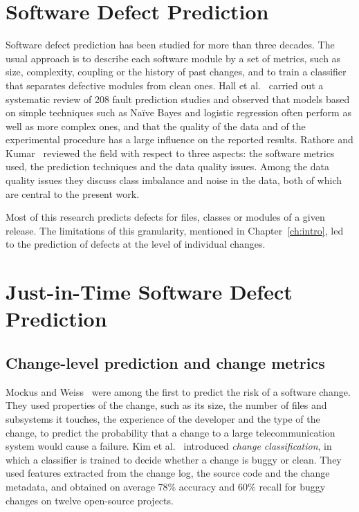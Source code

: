 \documentclass[12pt,a4paper,oneside]{report}
\begin{document}
\section{Software Defect Prediction}

Software defect prediction has been studied for more than three decades. The
usual approach is to describe each software module by a set of metrics, such
as size, complexity, coupling or the history of past changes, and to train a
classifier that separates defective modules from clean ones. Hall et
al.~\cite{hall2012slr} carried out a systematic review of 208 fault prediction
studies and observed that models based on simple techniques such as Na\"ive
Bayes and logistic regression often perform as well as more complex ones, and
that the quality of the data and of the experimental procedure has a large
influence on the reported results. Rathore and Kumar~\cite{rathore2019study}
reviewed the field with respect to three aspects: the software metrics used,
the prediction techniques and the data quality issues. Among the data quality
issues they discuss class imbalance and noise in the data, both of which are
central to the present work.

Most of this research predicts defects for files, classes or modules of a
given release. The limitations of this granularity, mentioned in
Chapter~\ref{ch:intro}, led to the prediction of defects at the level of
individual changes.

\section{Just-in-Time Software Defect Prediction}

\subsection{Change-level prediction and change metrics}

Mockus and Weiss~\cite{mockus2000risk} were among the first to predict the
risk of a software change. They used properties of the change, such as its
size, the number of files and subsystems it touches, the experience of the
developer and the type of the change, to predict the probability that a change
to a large telecommunication system would cause a failure. Kim et
al.~\cite{kim2008classifying} introduced \emph{change classification}, in
which a classifier is trained to decide whether a change is buggy or clean.
They used features extracted from the change log, the source code and the
change metadata, and obtained on average 78\% accuracy and 60\% recall for
buggy changes on twelve open-source projects.
\end{document}
